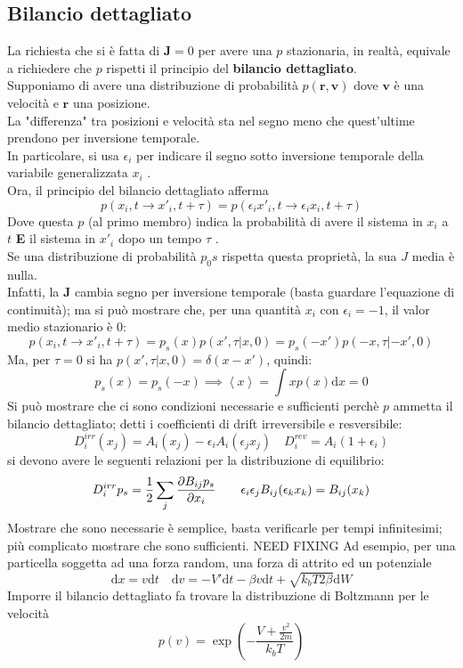 \documentclass[a4paper,12pt]{article}
\theoremstyle{plain}
\renewcommand{\vec}[1]{{\boldsymbol{#1}}}
\theoremstyle{definition}
\newcommand{\f}[2]{\frac{#1}{#2}}
\newcommand{\ave}[1]{\left\langle#1\right\rangle }
\renewcommand{\d}{\text{d}}
\newcommand{\rpos}{\vec{r}}
\newcommand{\tem}{k_b T }
\newcommand{\ra}{\rightarrow}
\theoremstyle{remark}
\begin{document}
\subsection{Bilancio dettagliato}
La richiesta che si è fatta di $\vec{J}=0$ per avere una $p$ stazionaria, in realtà, equivale a richiedere che $p$ rispetti il principio del \textbf{bilancio dettagliato}.\\ Supponiamo di avere una distribuzione di probabilità $p(\rpos,\vec{v})$ dove $\vec{v}$ è una velocità e $\rpos$ una posizione.\\La "differenza" tra posizioni e velocità sta nel segno meno che quest'ultime  prendono per inversione temporale.\\In particolare, si usa $\epsilon_i$ per indicare il segno sotto inversione temporale della variabile generalizzata $x_i$ .\\Ora, il principio del bilancio dettagliato afferma
\[p(x_i,t\ra x'_i,t+\tau)=p(\epsilon_i x'_i,t\ra \epsilon_i x_i,t+\tau)\]Dove questa $p$ (al primo membro) indica la probabilità di avere il sistema in $x_i$ a $t$ \textbf{E} il sistema in $x'_i$ dopo un tempo $\tau$ .
\\Se una distribuzione di probabilità $p_0s$ rispetta questa proprietà, la sua $J$ media è nulla.\\Infatti, la $\vec{J}$ cambia segno per inversione temporale (basta guardare l'equazione di continuità); ma si può mostrare che, per una quantità $x_i$ con $\epsilon_i=-1$, il valor medio stazionario è 0:
\[p(x_i,t\ra x'_i,t+\tau)=p_s(x)	p(x',\tau|x,0)=	p_s(-x')	p(-x,\tau|-x',0)\]
Ma, per $\tau=0$ si ha $p(x',\tau|x,0)=\delta(x-x')$, quindi:
\[p_s(x)=p_s(-x)\implies \ave{x}=\int xp(x)	 \d x=0			\]
Si può mostrare che ci sono condizioni necessarie e sufficienti perchè $p$ ammetta il bilancio dettagliato; detti i coefficienti di drift irreversibile e resversibile:
\[D^{irr}_i(x_j)=A_i(x_j)-\epsilon_i A_i (\epsilon_jx_j)\quad		D^{rev}_i=A_i(1+\epsilon_i)	\]
si devono avere le seguenti relazioni per la distribuzione di equilibrio:
\[D^{irr}_ip_s=\f{1}{2}\sum_j\pdv{B_{ij} p_s}{x_i}\quad \quad		\epsilon_i\epsilon_j B_{ij}(\epsilon_k x_k )=B_{ij}(x_k)\]
Mostrare che sono necessarie è semplice, basta verificarle per tempi infinitesimi; più complicato mostrare che sono sufficienti.
{\huge NEED FIXING}
Ad esempio, per una particella soggetta ad una forza random, una forza di attrito ed un potenziale
\[\d x= v	\d t 		\quad \d v=-V'\d t-\beta v\d t+\sqrt{\tem 2 \beta} \d W	\]
Imporre il bilancio dettagliato fa trovare la distribuzione di Boltzmann per le velocità
\[p(v)=\exp(-\f{V+\f{v^2}{2m}}{\tem})\]
\end{document}
